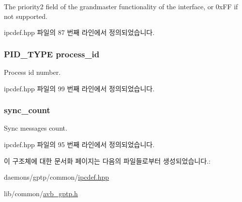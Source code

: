 The priority2 field of the grandmaster functionality of the interface, or 0x\+FF if not supported. 



ipcdef.\+hpp 파일의 87 번째 라인에서 정의되었습니다.

\subsubsection[{\texorpdfstring{process\+\_\+id}{process_id}}]{\setlength{\rightskip}{0pt plus 5cm}P\+I\+D\+\_\+\+T\+Y\+PE process\+\_\+id}\hypertarget{structg_ptp_time_data_aa5e5e89995d6bfb4b61b08fa89656812}{}\label{structg_ptp_time_data_aa5e5e89995d6bfb4b61b08fa89656812}


Process id number. 



ipcdef.\+hpp 파일의 99 번째 라인에서 정의되었습니다.

\subsubsection[{\texorpdfstring{sync\+\_\+count}{sync_count}}]{ sync\+\_\+count}\hypertarget{structg_ptp_time_data_ab918355ca94ac81d7397800a7ef77c0a}{}\label{structg_ptp_time_data_ab918355ca94ac81d7397800a7ef77c0a}


Sync messages count. 



ipcdef.\+hpp 파일의 95 번째 라인에서 정의되었습니다.



이 구조체에 대한 문서화 페이지는 다음의 파일들로부터 생성되었습니다.\+:\begin{DoxyCompactItemize}
\item 
daemons/gptp/common/\hyperlink{ipcdef_8hpp}{ipcdef.\+hpp}\item 
lib/common/\hyperlink{avb__gptp_8h}{avb\+\_\+gptp.\+h}\end{DoxyCompactItemize}
